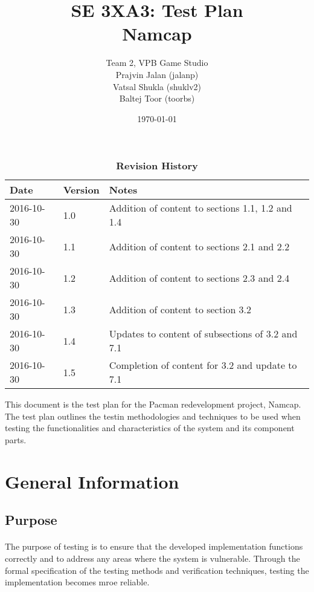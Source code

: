 \documentclass[12pt, titlepage]{article}
\title{SE 3XA3: Test Plan\\Namcap}
\author{Team 2, VPB Game Studio
		\\ Prajvin Jalan (jalanp)
		\\ Vatsal Shukla (shuklv2)
		\\ Baltej Toor (toorbs)
}
\date{\today}
\begin{document}
\maketitle

\tableofcontents
\listoftables
\listoffigures

\begin{table}[h]
\caption{\bf Revision History}
\begin{tabularx}{\textwidth}{p{3cm}p{2cm}X}
\toprule {\bf Date} & {\bf Version} & {\bf Notes}\\
\midrule
2016-10-30 & 1.0 & Addition of content to sections 1.1, 1.2 and 1.4\\
2016-10-30 & 1.1 & Addition of content to sections 2.1 and 2.2\\
2016-10-30 & 1.2 & Addition of content to sections 2.3 and 2.4\\
2016-10-30 & 1.3 & Addition of content to section 3.2\\
2016-10-30 & 1.4 & Updates to content of subsections of 3.2 and 7.1\\
2016-10-30 & 1.5 & Completion of content for 3.2 and update to 7.1\\
\bottomrule
\end{tabularx}
\end{table}

\newpage


This document is the test plan for the Pacman redevelopment project, Namcap. The test plan outlines the testin methodologies and techniques to be used when testing the functionalities and characteristics of the system and its component parts.

\section{General Information}

\subsection{Purpose}
\paragraph{}
The purpose of testing is to ensure that the developed implementation functions correctly and to address any areas where the system is vulnerable. Through the formal specification of the testing methods and verification techniques, testing the implementation becomes mroe reliable.
\end{document}
